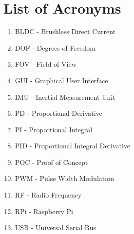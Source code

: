 \section{List of Acronyms}
\begin{enumerate}
	\item BLDC - Brushless Direct Current
	\item DOF - Degrees of Freedom
	\item FOV - Field of View
	\item GUI - Graphical User Interface
	\item IMU - Inertial Measurement Unit
	\item PD - Proportional Derivative
	\item PI - Proportional Integral
	\item PID - Proportional Integral Derivative
	\item POC - Proof of Concept
	\item PWM - Pulse Width Modulation
	\item RF - Radio Frequency
	\item RPi - Raspberry Pi
	\item USB - Universal Serial Bus
\end{enumerate}
